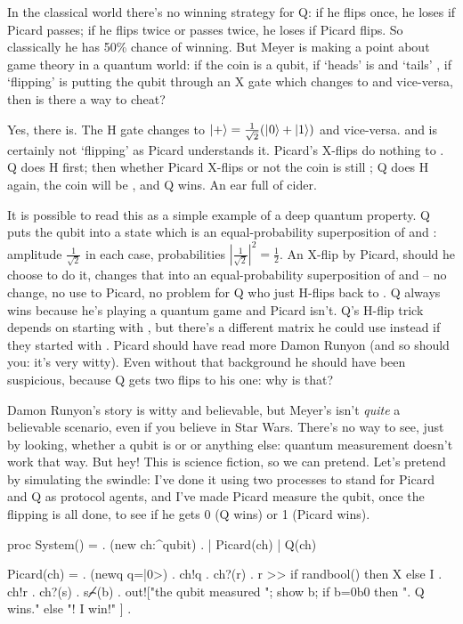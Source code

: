 In the classical world there's no winning strategy for Q: if he flips once, he loses if Picard passes; if he flips twice or passes twice, he loses if Picard flips. So classically he has 50\% chance of winning. But Meyer is making a point about game theory in a quantum world: if the coin is a qubit, if `heads' is \zero{} and `tails' \one{}, if `flipping' is putting the qubit through an X gate which changes \zero{} to \one{} and vice-versa, then is there a way to cheat?

Yes, there is. The H gate changes \zero{} to $\plus{}=\frac{1}{\sqrt2}(\zero+\one)$ and vice-versa. and is certainly not `flipping' as Picard understands it. Picard's X-flips do nothing to \plus{}. Q does H first; then whether Picard X-flips or not the coin is still \plus{}; Q does H again, the coin will be \zero{}, and Q wins. An ear full of cider.

It is possible to read this as a simple example of a deep quantum property. Q puts the qubit into a state which is an equal-probability superposition of \zero{} and \one{}: amplitude $\frac{1}{\sqrt2}$ in each case, probabilities $|\frac{1}{\sqrt2}|^{2}=\frac{1}{2}$. An X-flip by Picard, should he choose to do it, changes that into an equal-probability superposition of \one{} and \zero{} -- no change, no use to Picard, no problem for Q who just H-flips back to \zero{}. Q always wins because he's playing a quantum game and Picard isn't. Q's H-flip trick depends on starting with \zero{}, but there's a different matrix he could use instead if they started with \one{}. Picard should have read more Damon Runyon (and so should you: it's very witty). Even without that background he should have been suspicious, because Q gets two flips to his one: why is that?

Damon Runyon's story is witty and believable, but Meyer's isn't \emph{quite} a believable scenario, even if you believe in Star Wars. There's no way to see, just by looking, whether a qubit is \zero{} or \one{} or anything else: quantum measurement doesn't work that way. But hey! This is science fiction, so we can pretend. Let's pretend by simulating the swindle: I've done it using two processes to stand for Picard and Q as protocol agents, and I've made Picard measure the qubit, once the flipping is all done, to see if he gets 0 (Q wins) or 1 (Picard wins).

\mvb {\cointoss}
proc System() = . (new ch:^qubit) 
                . | Picard(ch) | Q(ch)  

     Picard(ch) = . (newq q=|0>) 
                  . ch!q
                  . ch?(r)
                  . r >> if randbool() then X else I
                  . ch!r 
                  . ch?(s)
                  . s⌢̸(b)
                  . out!["the qubit measured "; show b; 
                         if b=0b0 then ". Q wins.\n" else "! I win!\n"
                        ]
                  .

